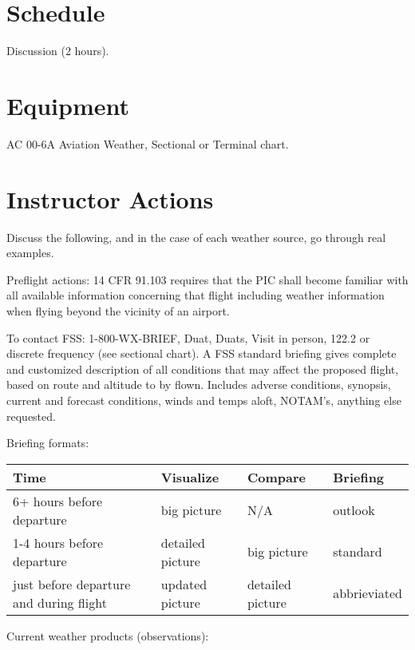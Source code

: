 \documentclass[twoside,openright]{report}
\begin{document}
\section{Schedule}

Discussion (2 hours).

\section{Equipment}

AC 00-6A Aviation Weather, Sectional or Terminal chart.

\section{Instructor Actions}

Discuss the following, and in the case of each weather source, go through real examples.

Preflight actions: 14 CFR 91.103 requires that the PIC shall become familiar
with all available information concerning that flight including weather
information when flying beyond the vicinity of an airport.

To contact FSS: 1-800-WX-BRIEF, Duat, Duats, Visit in person, 122.2 or discrete
frequency (see sectional chart). A FSS standard briefing gives complete and
customized description of all conditions that may affect the proposed flight,
based on route and altitude to by flown. Includes adverse conditions, synopsis,
current and forecast conditions, winds and temps aloft, NOTAM’s, anything else
requested.

Briefing formats:

\begin{table}[h]
\centering
\begin{tabular}{llll}
Time                                    & Visualize        & Compare          & Briefing     \\\hline
6+ hours before departure               & big picture      & N/A              & outlook      \\
1-4 hours before departure              & detailed picture & big picture      & standard     \\
just before departure and during flight & updated picture  & detailed picture & abbrieviated
\end{tabular}
\end{table}

Current weather products (observations):
\end{document}
